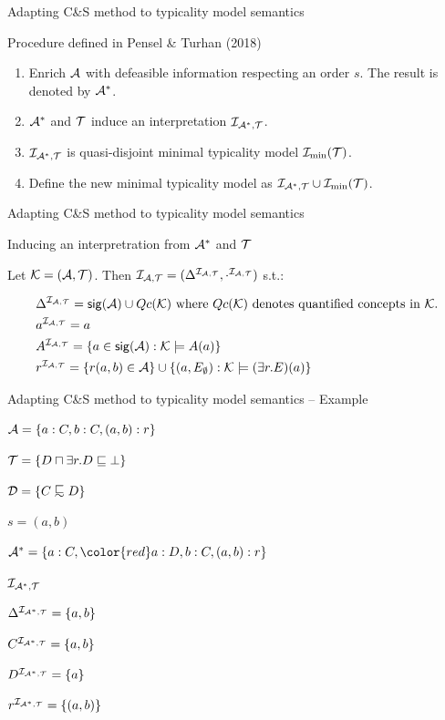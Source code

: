 \documentclass[10pt]{beamer}
\newcommand{\induceint}{\ensuremath{\Imc_{\Amc^{*}, \Tmc}}}
\begin{document}
\begin{frame}{Adapting C\&S method to typicality model semantics}

{\large
  Procedure defined in Pensel \& Turhan (2018)
}

{\large
  \begin{enumerate}
    \item Enrich $\mathcal{A}$ with defeasible information respecting an order $s$. The result is denoted by $\mathcal{A}^{*}$. \pause
    \item $\mathcal{A}^{*}$ and $\mathcal{T}$ induce an interpretation $\mathcal{I}_{\mathcal{A}^{*}, \mathcal{T}}$. \pause 
    \item $\mathcal{I}_{\mathcal{A}^{*}, \mathcal{T}}$ is quasi-disjoint \wrt minimal typicality model $\mathcal{I}_{\min}(\mathcal{T})$. \pause
    \item Define the new minimal typicality model as $\mathcal{I}_{\mathcal{A}^{*}, \mathcal{T}} \cup \mathcal{I}_{\min}(\mathcal{T})$. 
  \end{enumerate}
}
\end{frame}

\begin{frame}{Adapting C\&S method to typicality model semantics}

  Inducing an interpretration from $\mathcal{A}^{*}$ and $\mathcal{T}$

  \vspace{0.5cm}

    Let $\mathcal{K} = (\mathcal{A}, \mathcal{T})$. Then $\mathcal{I}_{{\mathcal{A}}, {\mathcal{T}}} = (\Delta^{\mathcal{I}_{{\mathcal{A}}, {\mathcal{T}}}}, \cdot^{\mathcal{I}_{{\mathcal{A}}, {\mathcal{T}}}})$ s.t.:
    
    \begin{align*}
        & \Delta^{\mathcal{I}_{{\mathcal{A}}, {\mathcal{T}}}} = {\sf sig}(\mathcal{A}) \cup Qc(\mathcal{K}) \text{ where } Qc(\mathcal{K}) \text{ denotes quantified concepts in }\mathcal{K}. \\
        & a^{\mathcal{I}_{{\mathcal{A}}, {\mathcal{T}}}} = a \\
        & A^{\mathcal{I}_{{\mathcal{A}}, {\mathcal{T}}}} = \{a \in {\sf sig}(\mathcal{A}) : \mathcal{K} \models A(a) \} \\ 
        & r^{\mathcal{I}_{{\mathcal{A}}, {\mathcal{T}}}} = \{r(a,b) \in \mathcal{A} \} \cup \{(a, {E}_{\emptyset}) : \mathcal{K} \models (\exists r.E)(a)\}
    \end{align*}

\end{frame}

\begin{frame}{Adapting C\&S method to typicality model semantics -- Example}

$\mathcal{A} = \{a:C, b:C, (a, b):r \}$ 

$\mathcal{T} = \{ D \sqcap \exists r.D \sqsubseteq \bot \}$

$\Dmc = \{ C \definc D \}$

$s = (a, b)$

\pause
\vspace{0.3cm}

$\Amc^{*} = \{a:C, {\color{red} a:D}, b:C, (a, b):r\}$

\pause
\vspace{0.3cm}

$\induceint$

$\Delta^{\induceint} = \{a, b\}$

$C^{\induceint} = \{a, b\}$

$D^{\induceint} = \{a\}$

$r^{\induceint} = \{(a,b)\}$
\end{frame}
\end{document}
